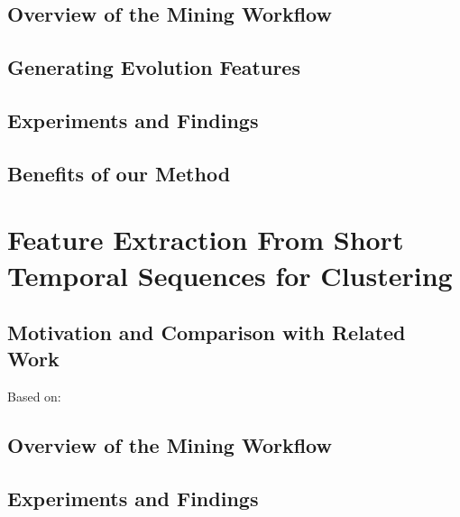 \documentclass[
]{book}
\begin{document}
\hypertarget{overview-of-the-mining-workflow}{%
\section{Overview of the Mining Workflow}\label{overview-of-the-mining-workflow}}

\hypertarget{generating-evolution-features}{%
\section{Generating Evolution Features}\label{generating-evolution-features}}

\hypertarget{experiments-and-findings-2}{%
\section{Experiments and Findings}\label{experiments-and-findings-2}}

\hypertarget{benefits-of-our-method-1}{%
\section{Benefits of our Method}\label{benefits-of-our-method-1}}

\hypertarget{diabfoot}{%
\chapter{Feature Extraction From Short Temporal Sequences for Clustering}\label{diabfoot}}

\hypertarget{motivation-and-comparison-with-related-work-3}{%
\section{Motivation and Comparison with Related Work}\label{motivation-and-comparison-with-related-work-3}}

Based on: \autocite{Niemann:CBMS2016,Niemann:PONE2016,Niemann:EBioMedicine2020}

\hypertarget{overview-of-the-mining-workflow-1}{%
\section{Overview of the Mining Workflow}\label{overview-of-the-mining-workflow-1}}

\hypertarget{experiments-and-findings-3}{%
\section{Experiments and Findings}\label{experiments-and-findings-3}}
\end{document}
